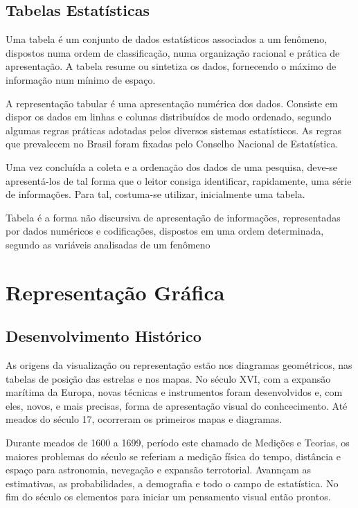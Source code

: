 \documentclass[
  letterpaper,
  DIV=11,
  numbers=noendperiod]{scrreprt}
\begin{document}
\hypertarget{tabelas-estatuxedsticas}{%
\section{Tabelas Estatísticas}\label{tabelas-estatuxedsticas}}

Uma tabela é um conjunto de dados estatísticos associados a um fenômeno,
dispostos numa ordem de classificação, numa organização racional e
prática de apresentação. A tabela resume ou sintetiza os dados,
fornecendo o máximo de informação num mínimo de espaço.

A representação tabular é uma apresentação numérica dos dados. Consiste
em dispor os dados em linhas e colunas distribuídos de modo ordenado,
segundo algumas regras práticas adotadas pelos diversos sistemas
estatísticos. As regras que prevalecem no Brasil foram fixadas pelo
Conselho Nacional de Estatística.

Uma vez concluída a coleta e a ordenação dos dados de uma pesquisa,
deve-se apresentá-los de tal forma que o leitor consiga identificar,
rapidamente, uma série de informações. Para tal, costuma-se utilizar,
inicialmente uma tabela.

Tabela é a forma não discursiva de apresentação de informações,
representadas por dados numéricos e codificações, dispostos em uma ordem
determinada, segundo as variáveis analisadas de um fenômeno


\hypertarget{representauxe7uxe3o-gruxe1fica}{%
\chapter{Representação Gráfica}\label{representauxe7uxe3o-gruxe1fica}}

\hypertarget{desenvolvimento-histuxf3rico}{%
\section{Desenvolvimento Histórico}\label{desenvolvimento-histuxf3rico}}

As origens da visualização ou representação estão nos diagramas
geométricos, nas tabelas de posição das estrelas e nos mapas. No século
XVI, com a expansão marítima da Europa, novas técnicas e instrumentos
foram desenvolvidos e, com eles, novos, e mais precisas, forma de
apresentação visual do conhcecimento. Até meados do século 17, ocorreram
os primeiros mapas e diagramas.

Durante meados de 1600 a 1699, período este chamado de Medições e
Teorias, os maiores problemas do século se referiam a medição física do
tempo, distância e espaço para astronomia, nevegação e expansão
terrotorial. Avannçam as estimativas, as probabilidades, a demografia e
todo o campo de estatística. No fim do século os elementos para iniciar
um pensamento visual então prontos.
\end{document}
